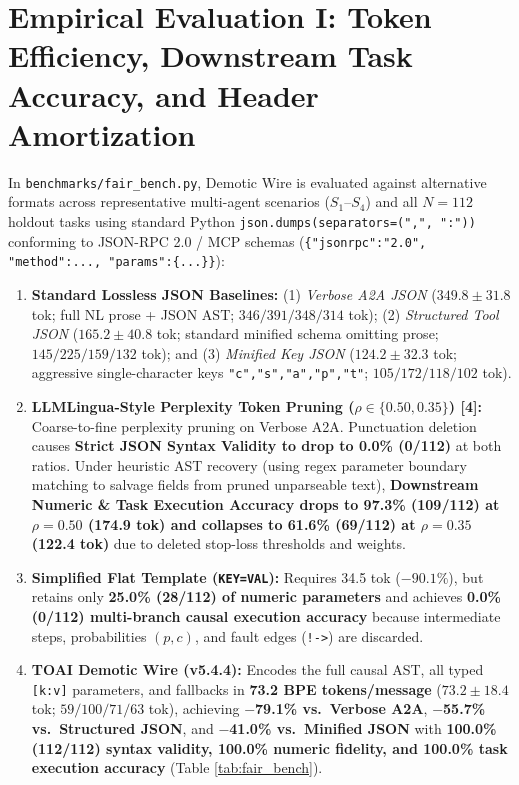 \documentclass[9pt,a4paper]{extarticle}
\begin{document}
\section{Empirical Evaluation I: Token Efficiency, Downstream Task Accuracy, and Header Amortization}
In \texttt{benchmarks/fair\_bench.py}, Demotic Wire is evaluated against alternative formats across representative multi-agent scenarios ($S_1\text{--}S_4$) and all $N=112$ holdout tasks using standard Python \texttt{json.dumps(separators=(",", ":"))} conforming to JSON-RPC 2.0 / MCP schemas (\texttt{\{"jsonrpc":"2.0", "method":..., "params":\{...\}\}}):
\begin{enumerate}
  \item \textbf{Standard Lossless JSON Baselines:} (1) \emph{Verbose A2A JSON} ($349.8 \pm 31.8$ tok; full NL prose + JSON AST; $346 / 391 / 348 / 314$ tok); (2) \emph{Structured Tool JSON} ($165.2 \pm 40.8$ tok; standard minified schema omitting prose; $145 / 225 / 159 / 132$ tok); and (3) \emph{Minified Key JSON} ($124.2 \pm 32.3$ tok; aggressive single-character keys \texttt{"c","s","a","p","t"}; $105 / 172 / 118 / 102$ tok).
  \item \textbf{LLMLingua-Style Perplexity Token Pruning ($\rho \in \{0.50, 0.35\}$) [4]:} Coarse-to-fine perplexity pruning on Verbose A2A. Punctuation deletion causes \textbf{Strict JSON Syntax Validity to drop to 0.0\% (0/112)} at both ratios. Under heuristic AST recovery (using regex parameter boundary matching to salvage fields from pruned unparseable text), \textbf{Downstream Numeric \& Task Execution Accuracy drops to 97.3\% (109/112) at $\rho=0.50$ (174.9 tok) and collapses to 61.6\% (69/112) at $\rho=0.35$ (122.4 tok)} due to deleted stop-loss thresholds and weights.
  \item \textbf{Simplified Flat Template (\texttt{KEY=VAL}):} Requires 34.5 tok ($-90.1\%$), but retains only \textbf{25.0\% (28/112) of numeric parameters} and achieves \textbf{0.0\% (0/112) multi-branch causal execution accuracy} because intermediate steps, probabilities $(p,c)$, and fault edges (\texttt{!->}) are discarded.
  \item \textbf{TOAI Demotic Wire (v5.4.4):} Encodes the full causal AST, all typed \texttt{[k:v]} parameters, and fallbacks in \textbf{73.2 BPE tokens/message} ($73.2 \pm 18.4$ tok; $59 / 100 / 71 / 63$ tok), achieving \textbf{$-$79.1\% vs.\ Verbose A2A}, \textbf{$-$55.7\% vs.\ Structured JSON}, and \textbf{$-$41.0\% vs.\ Minified JSON} with \textbf{100.0\% (112/112) syntax validity, 100.0\% numeric fidelity, and 100.0\% task execution accuracy} (Table \ref{tab:fair_bench}).
\end{enumerate}
\end{document}
